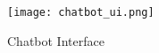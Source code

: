 \begin{figure}[h]
	\centering
	\texttt{[image: chatbot\_ui.png]}
	\caption{Chatbot Interface}
	\label{fig:chatbot_ui}
\end{figure}









